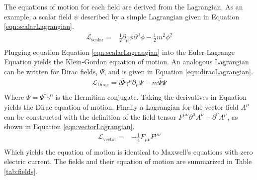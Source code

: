 The equations of motion for each field are derived from the Lagrangian.
As an example, a scalar field $\psi$ described by a simple Lagrangian given in Equation \ref{eqn:scalarLagrangian}.
\begin{equation}\begin{split}\label{eqn:scalarLagrangian}
    \mathcal{L}_\text{scalar}=&\frac{1}{2}\partial_\mu\phi\partial^\mu\phi-\frac{1}{2}m^2\phi^2 \\
\end{split}\end{equation}
Plugging equation Equation \ref{eqn:scalarLagrangian} into the Euler-Lagrange Equation \label{eqn:el} yields the Klein-Gordon equation of motion.
An analogous Lagrangian can be written for Dirac fields, $\Psi$, and is given in Equation \ref{eqn:diracLagrangian}.
\begin{equation}\begin{split}\label{eqn:diracLagrangian}
    \mathcal{L}_\text{Dirac}=i\overline{\Psi}\gamma^\mu\partial_\mu\Psi-m\overline{\Psi}\Psi \\
\end{split}\end{equation}
Where $\overline{\Psi}=\Psi^\dagger\gamma^0$ is the Hermitian conjugate.
Taking the derivatives in Equation \label{eqn:el} yields the Dirac equation of motion.
Finally a Lagrangian for the vector field $A^\mu$ can be constructed with the definition of the field tensor $F^{\mu\nu}\partial^\mu A^\nu-\partial^\nu A^\mu$, as shown in Equation \ref{eqn:vectorLagrangian}.
\begin{equation}\begin{split}\label{eqn:vectorLagrangian}
    \mathcal{L}_\text{vector}=&-\frac{1}{4}F_{\mu\nu}F^{\mu\nu} \\
\end{split}\end{equation}
Which yields the equation of motion is identical to Maxwell's equations with zero electric current.
The fields and their equation of motion are summarized in Table \ref{tab:fields}.

